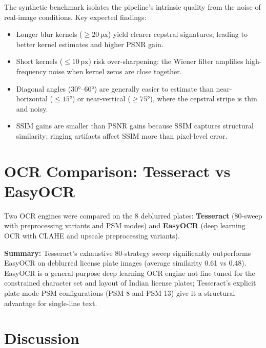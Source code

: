 \documentclass[12pt,a4paper]{article}
\begin{document}
The synthetic benchmark isolates the pipeline's intrinsic quality from the noise of
real-image conditions. Key expected findings:
\begin{itemize}[noitemsep, topsep=2pt]
  \item Longer blur kernels ($\geq 20\,\mathrm{px}$) yield clearer cepstral signatures,
    leading to better kernel estimates and higher PSNR gain.
  \item Short kernels ($\leq 10\,\mathrm{px}$) risk over-sharpening: the Wiener filter
    amplifies high-frequency noise when kernel zeros are close together.
  \item Diagonal angles ($30°$--$60°$) are generally easier to estimate than
    near-horizontal ($\leq 15°$) or near-vertical ($\geq 75°$), where the cepstral
    stripe is thin and noisy.
  \item SSIM gains are smaller than PSNR gains because SSIM captures structural similarity;
    ringing artifacts affect SSIM more than pixel-level error.
\end{itemize}

\section{OCR Comparison: Tesseract vs EasyOCR}

Two OCR engines were compared on the 8 deblurred plates:
\textbf{Tesseract} (80-sweep with preprocessing variants and PSM modes) and
\textbf{EasyOCR} (deep learning OCR with CLAHE and upscale preprocessing variants).


\textbf{Summary:} Tesseract's exhaustive 80-strategy sweep significantly outperforms
EasyOCR on deblurred license plate images (average similarity 0.61 vs 0.48).
EasyOCR is a general-purpose deep learning OCR engine not fine-tuned for the constrained
character set and layout of Indian license plates; Tesseract's explicit plate-mode PSM
configurations (PSM 8 and PSM 13) give it a structural advantage for single-line text.

\section{Discussion}
\end{document}
